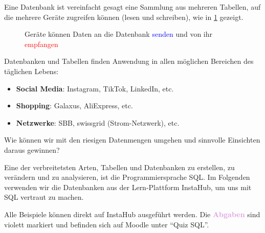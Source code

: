 Eine Datenbank ist vereinfacht gesagt eine Sammlung aus mehreren Tabellen, auf die mehrere Geräte zugreifen können (lesen und schreiben), wie in \cref{fig:db-schema} gezeigt.



\begin{figure}[H]
  \centering
  \caption{Geräte können Daten an die Datenbank \textcolor{blue}{senden} und von ihr \textcolor{red}{empfangen}}
  \label{fig:db-schema}
\end{figure}

Datenbanken und Tabellen finden Anwendung in allen möglichen Bereichen des täglichen Lebens:
\begin{itemize}
  \item \textbf{Social Media}: Instagram, TikTok, LinkedIn, etc.
  \item \textbf{Shopping}: Galaxus, AliExpress, etc.
  \item \textbf{Netzwerke}: SBB, swissgrid (Strom-Netzwerk), etc.
\end{itemize}

Wie können wir mit den riesigen Datenmengen umgehen und sinnvolle Einsichten daraus gewinnen?

Eine der verbreitetsten Arten, Tabellen und Datenbanken zu erstellen, zu verändern und zu analysieren, ist die Programmiersprache \gls{SQL}. Im Folgenden verwenden wir die Datenbanken aus der Lern-Plattform InstaHub, um uns mit \gls{SQL} vertraut zu machen.

Alle Beispiele können direkt auf InstaHub ausgeführt werden. Die \textcolor{Plum}{\textbf{Abgaben}} sind violett markiert
und befinden sich auf Moodle unter \enquote{Quiz \gls{SQL}}.


